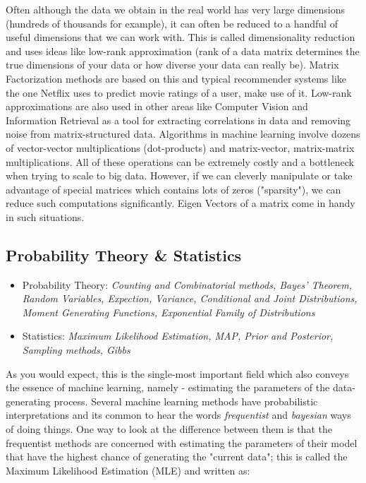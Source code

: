 \documentclass[a4paper]{article}
\begin{document}
Often although the data we obtain in the real world has very large dimensions (hundreds of thousands for example), it can often be reduced to a handful of useful dimensions that we can work with. This is called dimensionality reduction and uses ideas like low-rank approximation (rank of a data matrix determines the true dimensions of your data or how diverse your data can really be). Matrix Factorization methods are based on this and typical recommender systems like the one Netflix uses to predict movie ratings of a user, make use of it. Low-rank approximations are also used in other areas like Computer Vision and Information Retrieval as a tool for extracting correlations in data and removing noise from matrix-structured data. Algorithms in machine learning involve dozens of vector-vector multiplications (dot-products) and matrix-vector, matrix-matrix multiplications. All of these operations can be extremely costly and a bottleneck when trying to scale to big data. However, if we can cleverly manipulate or take advantage of special matrices which contains lots of zeros ("sparsity"), we can reduce such computations significantly. Eigen Vectors of a matrix come in handy in such situations.\\

\subsection{Probability Theory \& Statistics}
\begin{itemize}
\item Probability Theory: \textit{Counting and Combinatorial methods, Bayes' Theorem, Random Variables, Expection, Variance, Conditional and Joint Distributions, Moment Generating Functions, Exponential Family of Distributions}
\item Statistics: \textit{Maximum Likelihood Estimation, MAP, Prior and Posterior, Sampling methods, Gibbs}
\end{itemize}
As you would expect, this is the single-most important field which also conveys the essence of machine learning, namely - estimating the parameters of the data-generating process. Several machine learning methods have probabilistic interpretations and its common to hear the words {\it frequentist} and {\it bayesian} ways of doing things. One way to look at the difference between them is that the frequentist methods are concerned with estimating the parameters of their model that have the highest chance of generating the "current data"; this is called the Maximum Likelihood Estimation (MLE) and written as: \\
\end{document}
